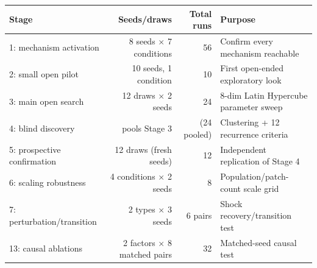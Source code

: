 \begin{tabular}{@{}lrrl@{}}
\toprule
\textbf{Stage} & \textbf{Seeds/draws} & \textbf{Total runs} & \textbf{Purpose} \\
\midrule
1: mechanism activation & 8 seeds $\times$ 7 conditions & 56 & Confirm every mechanism reachable \\
2: small open pilot      & 10 seeds, 1 condition        & 10 & First open-ended exploratory look \\
3: main open search       & 12 draws $\times$ 2 seeds     & 24 & 8-dim Latin Hypercube parameter sweep \\
4: blind discovery        & pools Stage 3               & (24 pooled) & Clustering + 12 recurrence criteria \\
5: prospective confirmation & 12 draws (fresh seeds)     & 12 & Independent replication of Stage 4 \\
6: scaling robustness      & 4 conditions $\times$ 2 seeds & 8 & Population/patch-count scale grid \\
7: perturbation/transition & 2 types $\times$ 3 seeds      & 6 pairs & Shock recovery/transition test \\
13: causal ablations       & 2 factors $\times$ 8 matched pairs & 32 & Matched-seed causal test \\
\bottomrule
\end{tabular}
